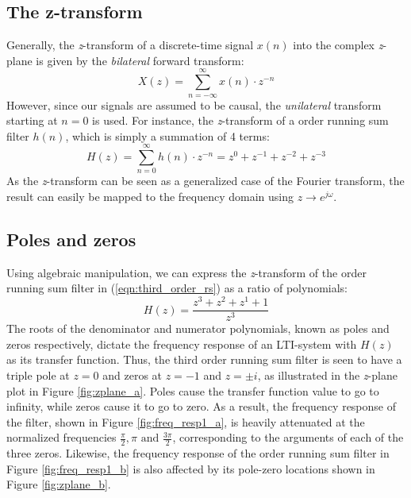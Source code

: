 \documentclass[journal]{IEEEtran}
\begin{document}
\subsection{The z-transform}
Generally, the \textit{z}-transform of a discrete-time signal $x(n)$ into the complex \textit{z}-plane is given by the \textit{bilateral} forward transform: 
\begin{equation}
\label{eqn:z_transform}
    X(z) = \sum_{n=-\infty}^{\infty} x(n) \cdot z^{-n}
\end{equation}
However, since our signals are assumed to be causal, the \textit{unilateral} transform starting at $n=0$ is used. For instance, the \textit{z}-transform of a  order running sum filter $h(n)$, which is simply a summation of 4 terms: 
\begin{equation}
\label{eqn:third_order_rs}
    H(z) = \sum_{n=0}^{\infty} h(n) \cdot z^{-n} = z^{0} + z^{-1} + z^{-2} + z^{-3} 
\end{equation}
As the \textit{z}-transform can be seen as a generalized case of the Fourier transform, the result can easily be mapped to the frequency domain using $z \rightarrow e^{j \omega}$.

\subsection{Poles and zeros}
Using algebraic manipulation, we can express the \textit{z}-transform of the  order running sum filter in (\ref{eqn:third_order_rs}) as a ratio of polynomials: 
\begin{equation}
\label{eqn:third_order_rs_tf}
    H(z) = \frac{z^3+z^2+z^1+1}{z^3}
\end{equation}
The roots of the denominator and numerator polynomials, known as poles and zeros respectively, dictate the frequency response of an LTI-system with $H(z)$ as its transfer function. %
Thus, the third order running sum filter is seen to have a triple pole at $z=0$ and zeros at $z=-1$ and $z=\pm i$, as illustrated in the \textit{z}-plane plot in Figure \ref{fig:zplane_a}. Poles cause the transfer function value to go to infinity, while zeros cause it to go to zero. As a result, the frequency response of the filter, shown in Figure \ref{fig:freq_resp1_a}, is heavily attenuated at the normalized frequencies $\frac{\pi}{2}, \pi \text{ and } \frac{3 \pi}{2}$, corresponding to the arguments of each of the three zeros. Likewise, the frequency response of the  order running sum filter in Figure \ref{fig:freq_resp1_b} is also affected by its pole-zero locations shown in Figure \ref{fig:zplane_b}. 
\end{document}
